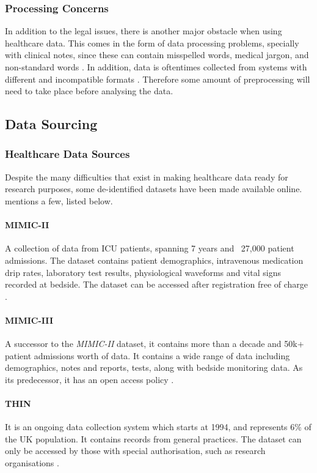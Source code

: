 \documentclass[a4paper,12pt]{article}
\begin{document}
\subsubsection{Processing Concerns}

In addition to the legal issues, there is another major obstacle when using healthcare data.
This comes in the form of data processing problems, specially with clinical notes, since these can contain misspelled words, medical jargon, and non-standard words \parencite{Dalianis2015}.
In addition, data is oftentimes collected from systems with different and incompatible formats \parencite[34]{Consoli2019}.
Therefore some amount of preprocessing will need to take place before analysing the data.

\subsection{Data Sourcing}

\subsubsection{Healthcare Data Sources}

Despite the many difficulties that exist in making healthcare data ready for research purposes,
some de-identified datasets have been made available online.
\textcite{Dalianis2015} mentions a few, listed below.

\paragraph{MIMIC-II} A collection of data from ICU patients,
spanning 7 years and ~27,000 patient admissions.
The dataset contains patient demographics, intravenous medication drip rates,
laboratory test results, physiological waveforms and vital signs recorded at bedside.
The dataset can be accessed after registration free of charge \parencite{Lee2011}.

\paragraph{MIMIC-III} A successor to the \textit{MIMIC-II} dataset,
it contains more than a decade and 50k+ patient admissions worth of data.
It contains a wide range of data including demographics, notes and reports,
tests, along with bedside monitoring data.
As its predecessor, it has an open access policy \parencite{Johnson2016}.

\paragraph{THIN} It is an ongoing data collection system which starts at 1994,
and represents 6\% of the UK population.
It contains records from general practices.
The dataset can only be accessed by those with special authorisation,
such as research organisations \parencite{Lewis2007}.
\end{document}
